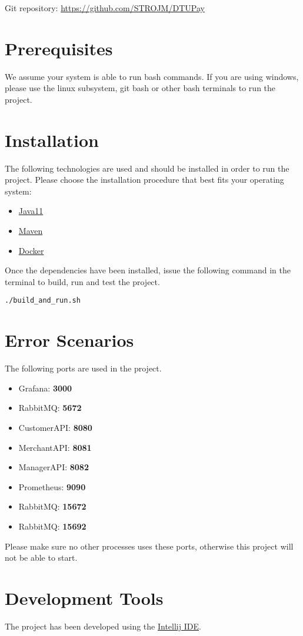 \documentclass[12pt]{article}
\newcommand{\port}[1]{\textbf{#1}}
\begin{document}
Git repository: \url{https://github.com/STROJM/DTUPay}
\section{Prerequisites}
We assume your system is able to run bash commands. If you are using windows, please use the linux subsystem, git bash or other bash terminals to run the project.


\section{Installation}
The following technologies are used and should be installed in order to run the project. Please choose the installation procedure that best fits your operating system:

\begin{itemize}
	\item{\href{https://www.oracle.com/java/technologies/downloads/#java11}{Java11}}
	\item{\href{https://maven.apache.org/install.html}{Maven}}
	\item{\href{https://docs.docker.com/get-docker/}{Docker}}
\end{itemize}

Once the dependencies have been installed, issue the following command in the terminal to build, run and test the project.

\begin{lstlisting}
./build_and_run.sh
\end{lstlisting}


\section{Error Scenarios}
The following ports are used in the project.
\begin{itemize}
	\item{Grafana: \port{3000}}
	\item{RabbitMQ: \port{5672}}
	\item{CustomerAPI: \port{8080}}
	\item{MerchantAPI: \port{8081}}
	\item{ManagerAPI: \port{8082}}
	\item{Prometheus: \port{9090}}
	\item{RabbitMQ: \port{15672}}
	\item{RabbitMQ: \port{15692}}
\end{itemize}

Please make sure no other processes uses these ports, otherwise this project will not be able to start.

\section{Development Tools}
The project has been developed using the \href{https://www.jetbrains.com/idea/}{Intellij IDE}.
\end{document}

